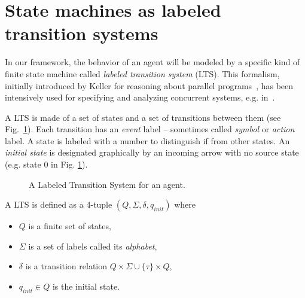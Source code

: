 \section{State machines as labeled transition systems\label{section:background-state-machines}}

In our framework, the behavior of an agent will be modeled by a specific kind of finite state machine called \emph{labeled transition system} (LTS). This formalism, initially introduced by Keller for reasoning about parallel programs~\cite{Keller:1976}, has been intensively used for specifying and analyzing concurrent systems, e.g. in~\cite{Milner:1989, Clarke:1989, Magee:1997}. 

A LTS is made of a set of states and a set of transitions between them (see Fig.~\ref{image:framework-start-stop}). Each transition has an \emph{event} label -- sometimes called \emph{symbol} or \emph{action} label. A state is labeled with a number to distinguish if from other states. An \emph{initial state} is designated graphically by an incoming arrow with no source state (e.g. state 0 in Fig. \ref{image:framework-start-stop}). 

\begin{figure}[H]
\centering{}
  \caption{A Labeled Transition System for an  agent\label{image:framework-start-stop}.}
\end{figure}

\begin{definition}
A LTS is defined as a 4-tuple $(Q,\Sigma,\delta,q_{init})$ where
\begin{itemize}
\item $Q$ is a finite set of states,
\item $\Sigma$ is a set of labels called its \emph{alphabet}, 
\item $\delta$ is a transition relation $Q \times \Sigma\cup\{\tau\} \times Q$,
\item $q_{init} \in Q$ is the initial state. 
\end{itemize}
\end{definition}

